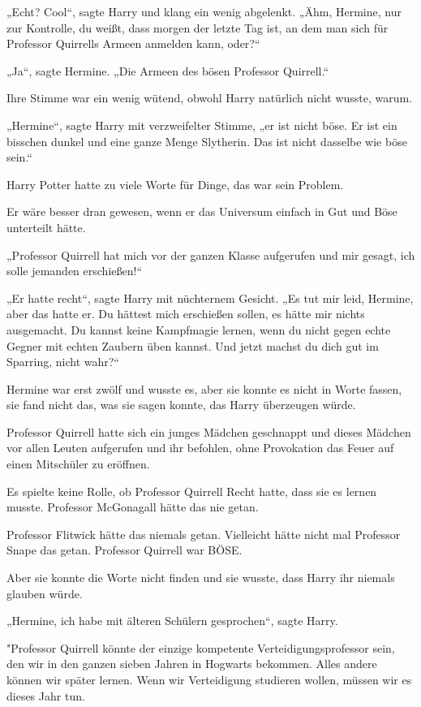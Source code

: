 {„Echt? Cool“, sagte Harry und klang ein wenig abgelenkt. „Ähm, Hermine, nur zur Kontrolle, du weißt, dass morgen der letzte Tag ist, an dem man sich für Professor Quirrells Armeen anmelden kann, oder?“

„Ja“, sagte Hermine. „Die Armeen des bösen Professor Quirrell.“

Ihre Stimme war ein wenig wütend, obwohl Harry natürlich nicht wusste, warum.

„Hermine“, sagte Harry mit verzweifelter Stimme, „er ist nicht böse. Er ist ein bisschen dunkel und eine ganze Menge Slytherin. Das ist nicht dasselbe wie böse sein.“

Harry Potter hatte zu viele Worte für Dinge, das war sein Problem.

Er wäre besser dran gewesen, wenn er das Universum einfach in Gut und Böse unterteilt hätte.

„Professor Quirrell hat mich vor der ganzen Klasse aufgerufen und mir gesagt, ich solle jemanden erschießen!“

„Er hatte recht“, sagte Harry mit nüchternem Gesicht. „Es tut mir leid, Hermine, aber das hatte er. Du hättest mich erschießen sollen, es hätte mir nichts ausgemacht. Du kannst keine Kampfmagie lernen, wenn du nicht gegen echte Gegner mit echten Zaubern üben kannst. Und jetzt machst du dich gut im Sparring, nicht wahr?“

Hermine war erst zwölf und wusste es, aber sie konnte es nicht in Worte fassen, sie fand nicht das, was sie sagen konnte, das Harry überzeugen würde.

Professor Quirrell hatte sich ein junges Mädchen geschnappt und dieses Mädchen vor allen Leuten aufgerufen und ihr befohlen, ohne Provokation das Feuer auf einen Mitschüler zu eröffnen.

Es spielte keine Rolle, ob Professor Quirrell Recht hatte, dass sie es lernen musste. Professor McGonagall hätte das nie getan.

Professor Flitwick hätte das niemals getan. Vielleicht hätte nicht mal Professor Snape das getan. Professor Quirrell war BÖSE.

Aber sie konnte die Worte nicht finden und sie wusste, dass Harry ihr niemals glauben würde.

„Hermine, ich habe mit älteren Schülern gesprochen“, sagte Harry.

"Professor Quirrell könnte der einzige kompetente Verteidigungsprofessor sein, den wir in den ganzen sieben Jahren in Hogwarts bekommen. Alles andere können wir später lernen. Wenn wir Verteidigung studieren wollen, müssen wir es dieses Jahr tun.

}
